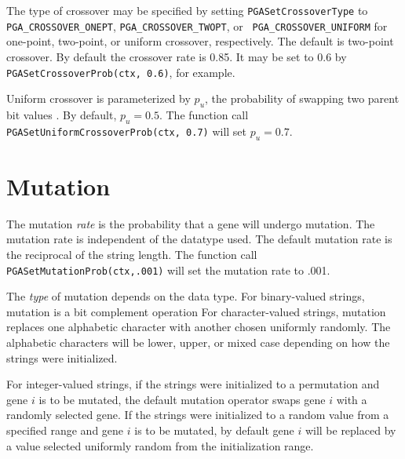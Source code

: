 \documentclass{report}
\begin{document}
\begin{sloppypar}
%
The type of crossover may be specified by setting {\tt PGASetCrossoverType} to
{\tt PGA\_CROSSOVER\_ONEPT}, {\tt PGA\_CROSSOVER\_TWOPT}, or {\tt
PGA\_CROSSOVER\_UNIFORM} for one-point, two-point, or uniform crossover,
respectively.  The default is two-point crossover.  By default the crossover
rate is 0.85.  It may be set to 0.6 by {\tt PGASetCrossoverProb(ctx, 0.6)},
for example.
\end{sloppypar}

Uniform crossover is parameterized by $p_u$, the probability of swapping two
parent bit values \cite{SpDe91}.  By default, $p_u = 0.5$.  The function call
{\tt PGASetUniformCrossoverProb(ctx, 0.7)} will set $p_u = 0.7$.


\section{Mutation}\label{sec:mutation}

The mutation {\em rate} is the probability that a gene will undergo
mutation.  The mutation rate is independent of the datatype used. The default
mutation rate is the reciprocal of the string length.  The function call {\tt
PGASetMutationProb(ctx,.001)} will set the mutation rate to .001.

The {\em type} of mutation depends on the data type.  For binary-valued
strings, mutation is a bit complement operation For
character-valued strings, mutation replaces one alphabetic character with
another chosen uniformly randomly.  The alphabetic characters will be lower,
upper, or mixed case depending on how the strings were initialized.

For integer-valued strings, if the strings were initialized to a permutation
and gene $i$ is to be mutated, the default mutation operator swaps gene $i$
with a randomly selected gene. If the strings were initialized to a random
value from a specified range and gene $i$ is to be mutated, by default gene
$i$ will be replaced by a value selected uniformly random from the
initialization range.
\end{document}
